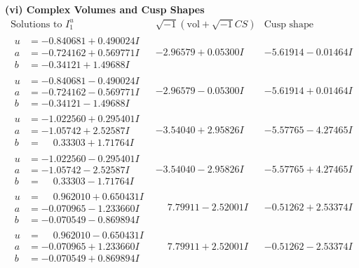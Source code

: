 \documentclass[1p]{elsarticle_modified}
\theoremstyle{definition}
\newcommand{\I}{\sqrt{-1}}
\begin{document}
\newpage\flushleft \textbf{(vi) Complex Volumes and Cusp Shapes}
$$\begin{array}{c|c|c}  
\text{Solutions to }I^u_{1}& \I (\text{vol} + \sqrt{-1}CS) & \text{Cusp shape}\\
 \hline 
\begin{aligned}
u &= -0.840681 + 0.490024 I \\
a &= -0.724162 + 0.569771 I \\
b &= -0.34121 + 1.49688 I\end{aligned}
 & -2.96579 + 0.05300 I & -5.61914 - 0.01464 I \\ \hline\begin{aligned}
u &= -0.840681 - 0.490024 I \\
a &= -0.724162 - 0.569771 I \\
b &= -0.34121 - 1.49688 I\end{aligned}
 & -2.96579 - 0.05300 I & -5.61914 + 0.01464 I \\ \hline\begin{aligned}
u &= -1.022560 + 0.295401 I \\
a &= -1.05742 + 2.52587 I \\
b &= \phantom{-}0.33303 + 1.71764 I\end{aligned}
 & -3.54040 + 2.95826 I & -5.57765 - 4.27465 I \\ \hline\begin{aligned}
u &= -1.022560 - 0.295401 I \\
a &= -1.05742 - 2.52587 I \\
b &= \phantom{-}0.33303 - 1.71764 I\end{aligned}
 & -3.54040 - 2.95826 I & -5.57765 + 4.27465 I \\ \hline\begin{aligned}
u &= \phantom{-}0.962010 + 0.650431 I \\
a &= -0.070965 - 1.233660 I \\
b &= -0.070549 - 0.869894 I\end{aligned}
 & \phantom{-}7.79911 - 2.52001 I & -0.51262 + 2.53374 I \\ \hline\begin{aligned}
u &= \phantom{-}0.962010 - 0.650431 I \\
a &= -0.070965 + 1.233660 I \\
b &= -0.070549 + 0.869894 I\end{aligned}
 & \phantom{-}7.79911 + 2.52001 I & -0.51262 - 2.53374 I \\ \hline\begin{aligned}

\end{aligned}
\end{array}$$
\end{document}
